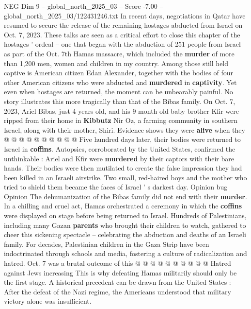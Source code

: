 \begin{textsample}{NEG Dim 9 – global\_north\_2025\_03 – Score -7.00 – global\_north\_2025\_03/122431246.txt}  \label{ex:f9_neg_148}
In recent days, negotiations in Qatar have resumed to secure the release of the remaining hostages abducted from Israel on Oct. 7, 2023.
These talks are seen as a critical effort to close this chapter of the hostages ' ordeal -- one that began with the abduction of 251 people from Israel as part of the Oct. 7th Hamas massacre, which included the \textbf{murder} of more than 1,200 men, women and children in my country.
Among those still held captive is American citizen Edan Alexander, together with the bodies of four other American citizens who were abducted and \textbf{murdered} in \textbf{captivity}.
Yet even when hostages are returned, the moment can be unbearably painful.
No story illustrates this more tragically than that of the Bibas family.
On Oct. 7, 2023, Ariel Bibas, just 4 years old, and his 9-month-old baby brother Kfir were ripped from their home in \textbf{Kibbutz} Nir Oz, a farming community in southern Israel, along with their mother, Shiri.
Evidence shows they were \textbf{alive} when they @ @ @ @ @ @ @ @ @ @ Five hundred days later, their bodies were returned to Israel in \textbf{coffins}.
Autopsies, corroborated by the United States, confirmed the unthinkable : Ariel and Kfir were \textbf{murdered} by their captors with their bare hands.
Their bodies were then mutilated to create the false impression they had been killed in an Israeli airstrike.
Two small, red-haired boys and the mother who tried to shield them became the faces of Israel ' s darkest day.
Opinion bug Opinion The dehumanization of the Bibas family did not end with their \textbf{murder}.
In a chilling and cruel act, Hamas orchestrated a ceremony in which the \textbf{coffins} were displayed on stage before being returned to Israel.
Hundreds of Palestinians, including many Gazan \textbf{parents} who brought their children to watch, gathered to cheer this sickening spectacle -- celebrating the abduction and deaths of an Israeli family.
For decades, Palestinian children in the Gaza Strip have been indoctrinated through schools and media, fostering a culture of radicalization and hatred.
Oct. 7 was a brutal outcome of this @ @ @ @ @ @ @ @ @ @ Hatred against Jews increasing This is why defeating Hamas militarily should only be the first stage.
A historical precedent can be drawn from the United States : After the defeat of the Nazi regime, the Americans understood that military victory alone was insufficient.

\end{textsample}
